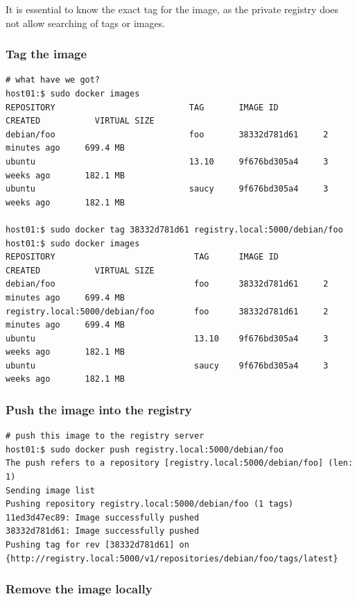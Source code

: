 \documentclass[captions=tableheading]{article}
\begin{document}
It is essential to know the exact tag for the image, as the private registry does not allow searching of tags or images. 
\subsubsection{Tag the image}
\label{sec-3-7-1}


\begin{verbatim}
# what have we got?
host01:$ sudo docker images
REPOSITORY                           TAG       IMAGE ID         CREATED           VIRTUAL SIZE
debian/foo                           foo       38332d781d61     2 minutes ago     699.4 MB
ubuntu                               13.10     9f676bd305a4     3 weeks ago       182.1 MB
ubuntu                               saucy     9f676bd305a4     3 weeks ago       182.1 MB

host01:$ sudo docker tag 38332d781d61 registry.local:5000/debian/foo
host01:$ sudo docker images 
REPOSITORY                            TAG      IMAGE ID         CREATED           VIRTUAL SIZE
debian/foo                            foo      38332d781d61     2 minutes ago     699.4 MB
registry.local:5000/debian/foo        foo      38332d781d61     2 minutes ago     699.4 MB
ubuntu                                13.10    9f676bd305a4     3 weeks ago       182.1 MB
ubuntu                                saucy    9f676bd305a4     3 weeks ago       182.1 MB
\end{verbatim}
\subsubsection{Push the image into the registry}
\label{sec-3-7-2}


\begin{verbatim}
# push this image to the registry server
host01:$ sudo docker push registry.local:5000/debian/foo
The push refers to a repository [registry.local:5000/debian/foo] (len: 1)
Sending image list
Pushing repository registry.local:5000/debian/foo (1 tags)
11ed3d47ec89: Image successfully pushed 
38332d781d61: Image successfully pushed 
Pushing tag for rev [38332d781d61] on {http://registry.local:5000/v1/repositories/debian/foo/tags/latest}
\end{verbatim}
\subsubsection{Remove the image locally}
\label{sec-3-7-3}
\end{document}
